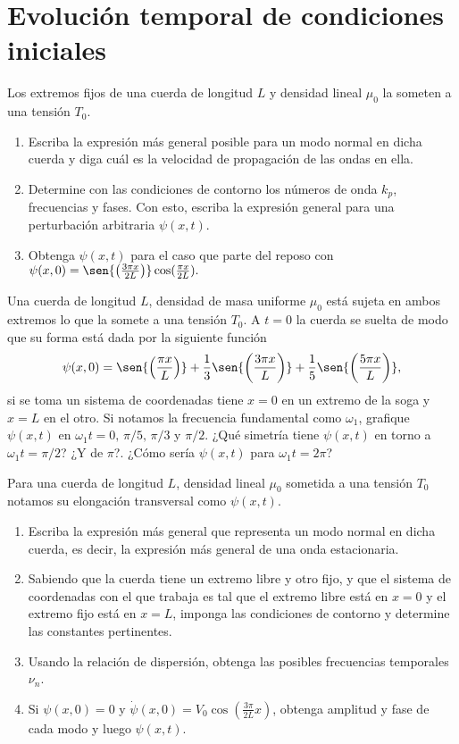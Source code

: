 \section*{Evolución temporal de condiciones iniciales}

\item Los extremos fijos de una cuerda de longitud $L$ y densidad lineal $\mu_0$ la someten a una tensión $T_0$.
\begin{enumerate}
	\item Escriba la expresión más general posible para un modo normal en dicha cuerda y diga cuál es la velocidad de propagación de las ondas en ella.
	\item Determine con las condiciones de contorno los números de onda $k_p$, frecuencias y fases.
	Con esto, escriba la expresión general para una perturbación arbitraria $\psi(x,t)$.
	\item Obtenga $\psi(x,t)$ para el caso que parte del reposo con
	$
	\psi(x,0) = \sen{\left( \frac{3\pi x}{2L} \right)} \cos( \frac{\pi x}{2L} ).
	$
\end{enumerate}


\item Una cuerda de longitud $L$, densidad de masa uniforme $\mu_{0}$ está sujeta en ambos extremos lo que la somete a una tensión $T_{0}$.
A $t=0$ la cuerda se suelta de modo que su forma está dada por la siguiente función
$$
\psi(x,0) = \sen{ \left(\frac{\pi x}{L} \right) } + \frac{1}{3} \sen{ \left( \frac{3\pi x}{L} \right) } + \frac{1}{5} \sen{ \left( \frac{5\pi x}{L} \right) },
$$
si se toma un sistema de coordenadas tiene $x=0$ en un extremo de la soga y $x = L$ en el otro. 
	Si notamos la frecuencia fundamental como $\omega_{1}$, grafique $\psi(x,t)$ en $\omega_1 t = 0,\,\pi/5,\,\pi/3$ y $\pi/2$.
	¿Qué simetría tiene $\psi(x,t)$ en torno a $\omega_1 t = \pi/2$?
	¿Y de $\pi$?.
	¿Cómo sería $\psi(x,t)$ para $\omega_1 t = 2 \pi$?


\item Para una cuerda de longitud $L$, densidad lineal $\mu_{0}$ sometida a una tensión $T_0$ notamos su elongación transversal como $\psi(x,t)$.
\begin{enumerate}
	\item Escriba la expresión más general que representa un modo normal en
dicha cuerda, es decir, la expresión más general de una onda estacionaria.
	\item Sabiendo que la cuerda tiene un extremo libre y otro fijo, y que el
sistema de coordenadas con el que trabaja es tal que el extremo libre
está en $x=0$ y el extremo fijo está en $x=L$, imponga las condiciones
de contorno y determine las constantes pertinentes.
	\item Usando la relación de dispersión, obtenga las posibles frecuencias
temporales $\nu_{n}$. 
	\item Si $\psi(x,0)=0$ y $\dot{\psi}(x,0)=V_{0}\cos\left(\frac{3\pi}{2L}x\right)$, obtenga amplitud y fase de cada modo y luego $\psi(x,t)$.
\end{enumerate}


